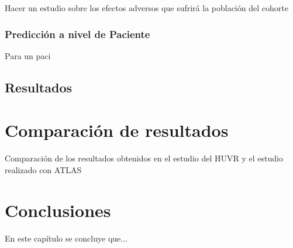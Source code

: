 Hacer un estudio sobre los efectos adversos que sufrirá la población del cohorte

\subsubsection{Predicción a nivel de Paciente}

Para un paci

\subsection{Resultados}


\section{Comparación de resultados} \label{sec:08resultados}


Comparación de los resultados obtenidos en el estudio del HUVR y el estudio realizado con ATLAS


\section{Conclusiones} \label{sec:08conclusiones}

En este capítulo se concluye que...